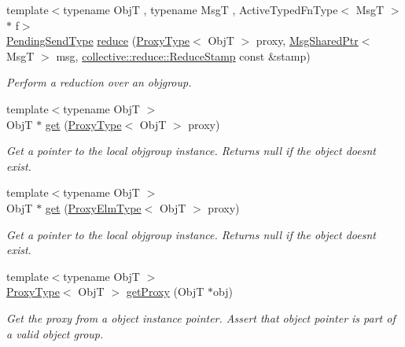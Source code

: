 \begin{DoxyCompactItemize}
{\footnotesize template$<$typename ObjT , typename MsgT , Active\+Typed\+Fn\+Type$<$ Msg\+T $>$ $\ast$ f$>$ }\\\hyperlink{structvt_1_1objgroup_1_1_obj_group_manager_a4f82f640edf670ba5a282074e5710921}{Pending\+Send\+Type} \hyperlink{structvt_1_1objgroup_1_1_obj_group_manager_a2aac72728c665b10dc7df994b3e326bc}{reduce} (\hyperlink{structvt_1_1objgroup_1_1_obj_group_manager_aea65eef52f240a52210132eef5ce591f}{Proxy\+Type}$<$ ObjT $>$ proxy, \hyperlink{namespacevt_ab2b3d506ec8e8d1540aede826d84a239}{Msg\+Shared\+Ptr}$<$ MsgT $>$ msg, \hyperlink{namespacevt_1_1collective_1_1reduce_a7b7cb3021ac5654d92825d9fab0250b2}{collective\+::reduce\+::\+Reduce\+Stamp} const \&stamp)
\begin{DoxyCompactList}\small\item\em Perform a reduction over an objgroup. \end{DoxyCompactList}\item 
{\footnotesize template$<$typename ObjT $>$ }\\ObjT $\ast$ \hyperlink{structvt_1_1objgroup_1_1_obj_group_manager_a4b11402fc31ca40e1dd2eacb65101e2b}{get} (\hyperlink{structvt_1_1objgroup_1_1_obj_group_manager_aea65eef52f240a52210132eef5ce591f}{Proxy\+Type}$<$ ObjT $>$ proxy)
\begin{DoxyCompactList}\small\item\em Get a pointer to the local objgroup instance. Returns null if the object doesn\textquotesingle{}t exist. \end{DoxyCompactList}\item 
{\footnotesize template$<$typename ObjT $>$ }\\ObjT $\ast$ \hyperlink{structvt_1_1objgroup_1_1_obj_group_manager_a70e5e1d0ada31d6f88a8ec88965df895}{get} (\hyperlink{structvt_1_1objgroup_1_1_obj_group_manager_adba6c8ecb0f4c30e719f1abb995cfc9b}{Proxy\+Elm\+Type}$<$ ObjT $>$ proxy)
\begin{DoxyCompactList}\small\item\em Get a pointer to the local objgroup instance. Returns null if the object doesn\textquotesingle{}t exist. \end{DoxyCompactList}\item 
{\footnotesize template$<$typename ObjT $>$ }\\\hyperlink{structvt_1_1objgroup_1_1_obj_group_manager_aea65eef52f240a52210132eef5ce591f}{Proxy\+Type}$<$ ObjT $>$ \hyperlink{structvt_1_1objgroup_1_1_obj_group_manager_a9758d68a4656e7ff2eb1ac07b4feeeed}{get\+Proxy} (ObjT $\ast$obj)
\begin{DoxyCompactList}\small\item\em Get the proxy from a object instance pointer. Assert that object pointer is part of a valid object group. \end{DoxyCompactList}\item 

\end{DoxyCompactItemize}
